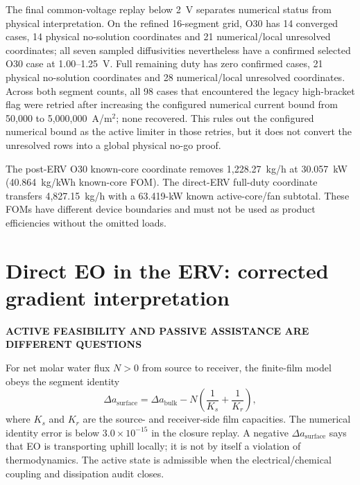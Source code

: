\documentclass[10pt,a4paper]{article}
\newcommand{\eyebrow}[1]{{\sffamily\bfseries\small\color{Teal}\MakeUppercase{#1}}}
\begin{document}
The final common-voltage replay below 2~V separates numerical status from
physical interpretation. On the refined 16-segment grid, O30 has 14 converged
cases, 14 physical no-solution coordinates and 21 numerical/local unresolved
coordinates; all seven sampled diffusivities nevertheless have a confirmed
selected O30 case at 1.00--1.25~V. Full remaining duty has zero confirmed
cases, 21 physical no-solution coordinates and 28 numerical/local unresolved
coordinates. Across both segment counts, all 98 cases that encountered the
legacy high-bracket flag were retried after increasing the configured numerical
current bound from 50,000 to 5,000,000~A/m$^2$; none recovered. This rules out
the configured numerical bound as the active limiter in those retries, but it
does not convert the unresolved rows into a global physical no-go proof.

The post-ERV O30 known-core coordinate removes 1,228.27~kg/h at
30.057~kW (40.864~kg/kWh known-core FOM). The direct-ERV full-duty coordinate
transfers 4,827.15~kg/h with a 63.419-kW known active-core/fan subtotal. These
FOMs have different device boundaries and must not be used as product
efficiencies without the omitted loads.

\section{Direct EO in the ERV: corrected gradient interpretation}
\eyebrow{Active feasibility and passive assistance are different questions}

For net molar water flux $N>0$ from source to receiver, the finite-film model
obeys the segment identity
\begin{equation}
  \Delta a_{\mathrm{surface}}
  = \Delta a_{\mathrm{bulk}}
  - N\left(\frac{1}{K_s}+\frac{1}{K_r}\right),
  \label{eq:film-identity}
\end{equation}
where $K_s$ and $K_r$ are the source- and receiver-side film capacities.
The numerical identity error is below $3.0\times10^{-15}$ in the closure
replay. A negative $\Delta a_{\mathrm{surface}}$ says that EO is transporting
uphill locally; it is not by itself a violation of thermodynamics. The active
state is admissible when the electrical/chemical coupling and dissipation
audit closes.
\end{document}
